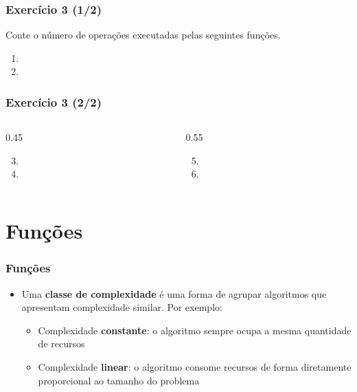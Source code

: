 \documentclass[aspectratio=169]{beamer}
\begin{document}
\begin{frame}[fragile]\frametitle{Exercício 3 (1/2)}
Conte o número de operações executadas pelas seguintes funções.
\begin{enumerate}[a]
	\item {\scriptsize}
	\item {\scriptsize}
\end{enumerate}
\end{frame}

\begin{frame}[fragile]\frametitle{Exercício 3 (2/2)}
\begin{columns}[T]
\begin{column}{0.45\linewidth}
\begin{enumerate}[a]
	\setcounter{enumi}{2}
	\item {\scriptsize}
	\item {\scriptsize}
\end{enumerate}
\end{column}
\begin{column}{0.55\linewidth}
\begin{enumerate}[a]
	\setcounter{enumi}{4}
	\item {\scriptsize}
	\item {\scriptsize}
\end{enumerate}
\end{column}
\end{columns}
\end{frame}

\section{Funções}

\begin{frame}\frametitle{Funções}
\begin{itemize}
	\item Uma \textbf{classe de complexidade} é uma forma de agrupar algoritmos que apresentam complexidade similar. Por exemplo:
	\begin{itemize}
		\item Complexidade \textbf{constante}: o algoritmo sempre ocupa a mesma quantidade de recursos
		\item Complexidade \textbf{linear}: o algoritmo consome recursos de forma diretamente proporcional ao tamanho do problema
	\end{itemize}
\end{itemize}
\end{frame}
\end{document}
